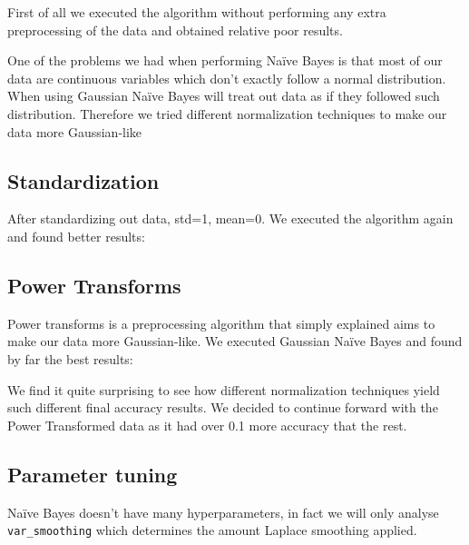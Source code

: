 First of all we executed the algorithm without performing any extra preprocessing of the data and obtained
relative poor results.


One of the problems we had when performing Na\"ive Bayes is that most of our data are continuous variables
which don't exactly follow a normal distribution. When using Gaussian Na\"ive Bayes will treat out data 
as if they followed such distribution. Therefore we tried different normalization techniques to make our
data more Gaussian-like

\subsection{Standardization}

After standardizing out data, std=1, mean=0. We executed the algorithm again and found better results:


\subsection{Power Transforms}

Power transforms is a preprocessing algorithm that simply explained aims to make our data more Gaussian-like. We executed Gaussian Na\"ive Bayes and found by far the best results:


We find it quite surprising to see how different normalization techniques yield such 
different final accuracy results. We decided to continue forward with the Power 
Transformed data as it had over 0.1 more accuracy that the rest.

\subsection{Parameter tuning}

Na\"ive Bayes doesn't have many hyperparameters, in fact we will only analyse \texttt{var\_smoothing} which determines the amount Laplace smoothing applied.

